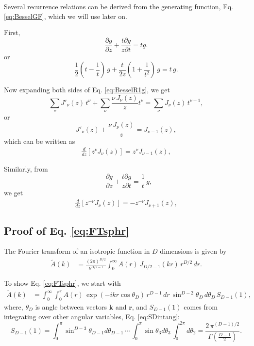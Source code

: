 \documentclass[preprint]{revtex4-1}
\numberwithin{equation}{subsection}
\numberwithin{table}{section}
\newcommand{\vct}[1]{\mathbf{#1}}
\providecommand{\vr}{} %
\renewcommand{\vr}{\vct{r}}
\newcommand{\vk}{\vct{k}}
\begin{document}
Several recurrence relations can be derived from the generating function,
Eq. \eqref{eq:BesselGF}, which we will use later on.

First,
\begin{equation}
  \frac { \partial g } { \partial z}
+
  \frac { t \partial g } { z \partial t}
=
  t g.
  \label{eq:BesselR1g}
\end{equation}
or
\[
\frac 1 2 \left( t - \frac 1 t \right) \, g
+
\frac {t} {2 z} \left( 1 + \frac 1 { t^2 } \right) \, g
=
  t \, g.
\]

Now expanding both sides of Eq. \eqref{eq:BesselR1g},
we get
\[
  \sum_\nu J'_\nu(z) \, t^\nu
+
  \sum_\nu \frac{ \nu \, J_\nu(z) } { z } t^\nu
=
  \sum_\nu J_{\nu}(z) \, t^{\nu+1},
\]
or
\[
  J'_\nu(z)
+
  \frac{ \nu \, J_\nu(z) } { z }
=
  J_{\nu - 1}(z),
\]
which can be written as
\begin{align}
  \frac{d}{dz} [z^{\nu} J_\nu(z)] = z^{\nu} J_{\nu-1}(z),
  \label{eq:BesselR1}
\end{align}

Similarly, from
\begin{equation}
-
  \frac { \partial g } { \partial z}
+
  \frac { t \partial g } { z \partial t}
=
  \frac{1}{t} \, g,
  \label{eq:BesselR2g}
\end{equation}
we get
\begin{align}
  \frac{d}{dz} [z^{-\nu} J_\nu(z)] = -z^{-\nu} J_{\nu+1}(z),
  \label{eq:BesselR2}
\end{align}





\subsection{Proof of Eq. \eqref{eq:FTsphr}}

The Fourier transform of an isotropic function in $D$ dimensions
is given by
\begin{align}
  \tilde A(k)
&=
\frac{(2\pi)^{D/2}}{k^{D/2-1}}
\int_0^\infty
A(r) \, J_{D/2-1}(kr) \,
r^{D/2} \, dr.
\tag{A1}
\label{eq:FTsphr}
\end{align}

To show Eq. \eqref{eq:FTsphr}, we start with
%
\begin{align}
  \tilde A(k)
&=
  \int_0^\infty
  \int_0^\pi
  A(r) \, \exp(-ikr \cos \theta_D) \,
    r^{D-1} \, dr \,
    \sin^{D-2} \theta_D \,
    d\theta_D \, S_{D-1}(1),
\label{eq:Aksphr}
\end{align}
%
where,
$\theta_D$ is angle between vectors $\vk$ and $\vr$,
and
$S_{D-1}(1)$ comes from integrating over other angular variables,
Eq. \eqref{eq:SDintang}:
\[
  S_{D-1}(1)
=
\int_0^\pi \sin^{D-3} \theta_{D-1} d\theta_{D-1} \,
\cdots \,
\int_0^\pi \sin \theta_3 d\theta_3 \,
\int_0^{2\pi} d\theta_2
=
\frac{2 \, \pi^{(D-1)/2} } { \Gamma\left( \frac{D-1} 2 \right) }.
\]
%
\end{document}
